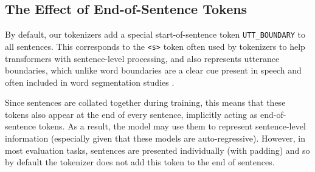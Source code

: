 \subsection{The Effect of End-of-Sentence Tokens}
\label{sec:14-endofsentence}

By default, our tokenizers add a special start-of-sentence token \texttt{UTT\_BOUNDARY} to all sentences. This corresponds to the \texttt{<s>} token often used by tokenizers to help transformers with sentence-level processing, and also represents utterance boundaries, which unlike word boundaries are a clear cue present in speech and often included in word segmentation studies \citep{feliciano-de-faria-2019-utterance-boundaries}. 

Since sentences are collated together during training, this means that these tokens also appear at the end of every sentence, implicitly acting as end-of-sentence tokens. As a result, the model may use them to represent sentence-level information (especially given that these models are auto-regressive). However, in most evaluation tasks, sentences are presented individually (with padding) and so by default the tokenizer does not add this token to the end of sentences. 

